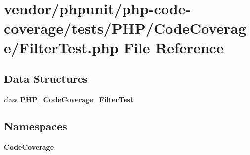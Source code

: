 \section{vendor/phpunit/php-\/code-\/coverage/tests/\+P\+H\+P/\+Code\+Coverage/\+Filter\+Test.php File Reference}
\label{_filter_test_8php}
\subsection*{Data Structures}
\begin{DoxyCompactItemize}
\item 
class {\bf P\+H\+P\+\_\+\+Code\+Coverage\+\_\+\+Filter\+Test}
\end{DoxyCompactItemize}
\subsection*{Namespaces}
\begin{DoxyCompactItemize}
\item 
 {\bf Code\+Coverage}
\end{DoxyCompactItemize}
